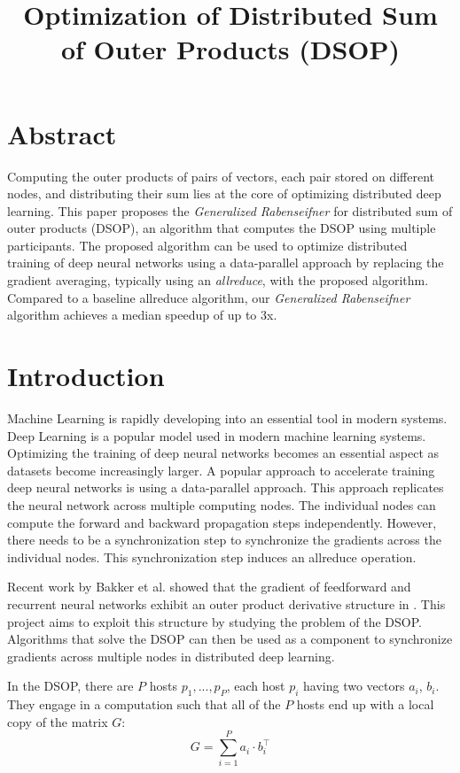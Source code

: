 \documentclass[letterpaper]{article}
\title{Optimization of Distributed Sum of Outer Products (DSOP)}
\newcommand{\code}{\textit}
\newcommand{\grabenseifner}{\textit{Generalized Rabenseifner}}
\begin{document}
%
\maketitle
%

\section{Abstract}
Computing the outer products of pairs of vectors, each pair stored on different nodes, and distributing their sum lies at the core of optimizing distributed deep learning. This paper proposes the \code{Generalized Rabenseifner} for distributed sum of outer products (DSOP), an algorithm that computes the DSOP using multiple participants. The proposed algorithm can be used to optimize distributed training of deep neural networks using a data-parallel approach by replacing the gradient averaging, typically using an \textit{allreduce}, with the proposed algorithm.
Compared to a baseline allreduce algorithm, our \grabenseifner{} algorithm achieves a median speedup of up to 3x.

\section{Introduction}\label{sec:intro}

Machine Learning is rapidly developing into an essential tool in modern systems. Deep Learning is a popular model used in modern machine learning systems. Optimizing the training of deep neural networks becomes an essential aspect as datasets become increasingly larger. A popular approach to accelerate training deep neural networks is using a data-parallel approach. This approach replicates the neural network across multiple computing nodes. The individual nodes can compute the forward and backward propagation steps independently. However, there needs to be a synchronization step to synchronize the gradients across the individual nodes. This synchronization step induces an allreduce operation. \cite{demystifying_hoefler}

Recent work by Bakker et al. showed that the gradient of feedforward and recurrent neural networks exhibit an outer product derivative structure in \cite{outer_product_structure_NN_derivatives}. This project aims to exploit this structure by studying the problem of the DSOP. Algorithms that solve the DSOP can then be used as a component to synchronize gradients across multiple nodes in distributed deep learning.

In the DSOP, there are $P$ hosts $p_1, ..., p_P$, each host $p_i$ having two vectors $a_i$, $b_i$. They engage in a computation such that all of the $P$ hosts end up with a local copy of the matrix $G$: %
\begin{equation}
    G = \sum_{i = 1}^{P} a_i \cdot b_{i}^{\top}
\end{equation}
\end{document}
